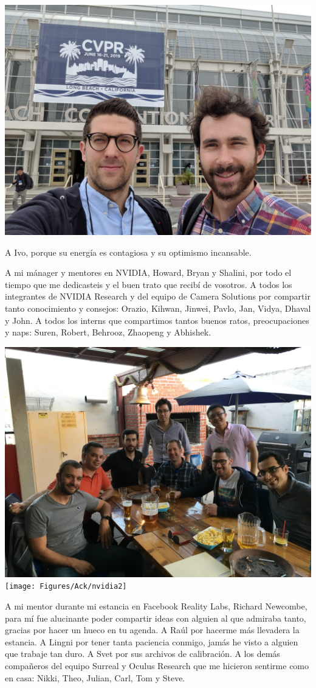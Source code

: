 \begin{center}
	\includegraphics[width=0.6\linewidth]{Figures/Ack/sergio}
\end{center}

A Ivo, porque su energía es contagiosa y su optimismo incansable.

A mi mánager y mentores en NVIDIA, Howard, Bryan y Shalini, por todo el tiempo que me dedicasteis y el buen trato que recibí de vosotros. A todos los integrantes de NVIDIA Research y del equipo de Camera Solutions por compartir tanto conocimiento y consejos: Orazio, Kihwan, Jinwei, Pavlo, Jan, Vidya, Dhaval y John. A todos los interns que compartimos tantos buenos ratos, preocupaciones y naps: Suren, Robert, Behrooz, Zhaopeng y Abhishek.

\begin{center}
\includegraphics[width=0.44\linewidth]{Figures/Ack/nvidia}
\texttt{[image: Figures/Ack/nvidia2]}
\end{center}

A mi mentor durante mi estancia en Facebook Reality Labs, Richard Newcombe, para mí fue alucinante poder compartir ideas con alguien al que admiraba tanto, gracias por hacer un hueco en tu agenda. A Raúl por hacerme más llevadera la estancia. A Lingni por tener tanta paciencia conmigo, jamás he visto a alguien que trabaje tan duro. A Svet por sus archivos de calibración. A los demás compañeros del equipo Surreal y Oculus Research que me hicieron sentirme como en casa: Nikki, Theo, Julian, Carl, Tom y Steve.

